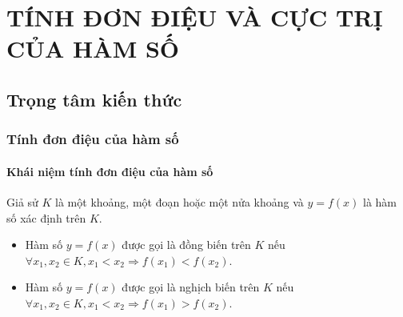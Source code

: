 \section{TÍNH ĐƠN ĐIỆU VÀ CỰC TRỊ CỦA HÀM SỐ}
\subsection{Trọng tâm kiến thức}
    \subsubsection{Tính đơn điệu của hàm số}
    \paragraph{Khái niệm tính đơn điệu của hàm số}
    \begin{dn}
        Giả sử $K$ là một khoảng, một đoạn hoặc một nửa khoảng và $y=f(x)$ là hàm số xác định trên $K$.
        \begin{itemize}
            \item Hàm số $y=f(x)$ được gọi là đồng biến trên $K$ nếu $\forall x_{1}, x_{2} \in K, x_{1}<x_{2} \Rightarrow f\left(x_{1}\right)<f\left(x_{2}\right)$.
            \item Hàm số $y=f(x)$ được gọi là nghịch biến trên $K$ nếu $\forall x_{1}, x_{2} \in K, x_{1}<x_{2} \Rightarrow f\left(x_{1}\right)>f\left(x_{2}\right)$.
        \end{itemize}
    \end{dn}
